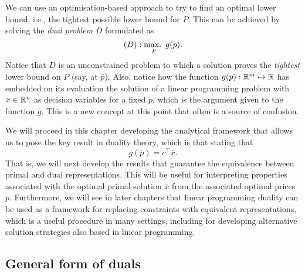 We can use an optimisation-based approach to try to find an optimal lower bound, i.e., the tightest possible lower bound for $P$. This can be achieved by solving the \emph{dual problem} $D$ formulated as 
%
\begin{equation*}
	(D) : \mathop{\text{max.~}}_p g(p).
\end{equation*}
%
Notice that $D$ is an unconstrained problem to which a solution proves the \emph{tightest} lower bound on $P$ (say, at $\overline{p}$). Also, notice how the function $g(p) : \mathbb{R}^m \mapsto \mathbb{R}$ has embedded on its evaluation the solution of a linear programming problem with $x \in \mathbb{R}^n$ as decision variables for a fixed $p$, which is the argument given to the function $g$. This is a new concept at this point that often is a source of confusion. 

We will proceed in this chapter developing the analytical framework that allows us to pose the key result in duality theory, which is that stating that 
%
\begin{equation*}
	g(\overline{p}) = c^\top \overline{x}.	
\end{equation*}
%
That is, we will next develop the results that guarantee the equivalence between primal and dual representations. This will be useful for interpreting properties associated with the optimal primal solution $\overline{x}$ from the associated optimal prices $\overline{p}$. Furthermore, we will see in later chapters that linear programming duality can be used as a framework for replacing constraints with equivalent representations, which is a useful procedure in many settings, including for developing alternative solution strategies also based in linear programming. 


\subsection{General form of duals}

